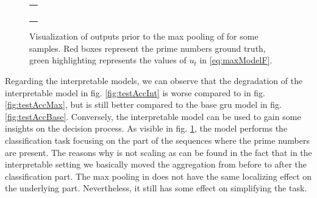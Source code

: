 \begin{figure}
  \centering
  \footnotesize
  \begin{tabular}{|p{\floatwidth}|}
    \hline
    \\
    \hline
    \\
    \hline
    \\
    \hline
    \\
    \hline
    \\
    \hline
    \\
    \hline
  \end{tabular}
  \caption{Visualization of outputs prior to the max pooling of
    \maxi{} for some 
    samples. Red boxes represent the prime numbers ground
    truth, green highlighting represents the values of $u_t$ in
    \eqref{eq:maxModelF}.}
  \label{fig:testAttention}
\end{figure}

Regarding the interpretable models, we can observe that
the degradation of the interpretable \maxi{} model in
fig. \ref{fig:testAccInt} is worse 
compared to \maxp{} in fig. \ref{fig:testAccMax},
but is still better compared to the base \ac{gru} model in
fig. \ref{fig:testAccBase}. Conversely, the interpretable model can be
used to gain
some insights on the decision process. As visible in
fig. \ref{fig:testAttention}, the model performs the classification
task focusing on 
the part of the sequences where the prime numbers are present. The
reasons why \maxi{} is not scaling as \maxp{} can be found in the fact
that in the interpretable setting we basically moved the aggregation
from before to after the classification part. The max pooling in
\maxi{} does not have the same localizing effect on the underlying
part. Nevertheless, it still has some effect on simplifying the
task.

